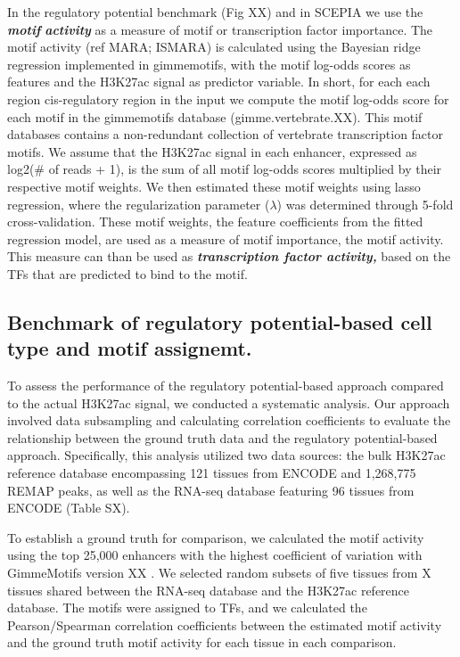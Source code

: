 In the regulatory potential benchmark (Fig XX) and in SCEPIA we use the \textbf{\textit{motif}} \textbf{\textit{activity}} as a measure of motif or transcription factor importance. The motif activity (ref MARA; ISMARA\cite{Balwierz2014}) is calculated using the Bayesian ridge regression implemented in gimmemotifs\cite{Bruse_2018}, with the motif log-odds scores as features and the H3K27ac signal as predictor variable. In short, for each each region cis-regulatory region in the input we compute the motif log-odds score for each motif in the gimmemotifs database (gimme.vertebrate.XX). This motif databases contains a non-redundant collection of vertebrate transcription factor motifs\cite{Bruse_2018}. We assume that the H3K27ac signal in each enhancer, expressed as log2(# of reads + 1), is the sum of all motif log-odds scores multiplied by their respective motif weights. We then estimated these motif weights using lasso regression, where the regularization parameter ($\lambda$) was determined through 5-fold cross-validation. These motif weights, the feature coefficients from the fitted regression model, are used as a measure of motif importance, the motif activity. This measure can than be used as \textit{\textbf{transcription factor activity,}} based on the TFs that are predicted to bind to the motif.

\subsection{Benchmark of regulatory potential-based cell type and motif assignemt.}

To assess the performance of the regulatory potential-based approach compared to the actual H3K27ac signal, we conducted a systematic analysis. Our approach involved data subsampling and calculating correlation coefficients to evaluate the relationship between the ground truth data and the regulatory potential-based approach. Specifically, this analysis utilized two data sources: the bulk H3K27ac reference database encompassing 121 tissues from ENCODE and 1,268,775 REMAP peaks, as well as the RNA-seq database featuring 96 tissues from ENCODE (Table SX).

To establish a ground truth for comparison, we calculated the motif activity using the top 25,000 enhancers with the highest coefficient of variation with GimmeMotifs version XX \cite{Bruse_2018}. We selected random subsets of five tissues from X tissues shared between the RNA-seq database and the H3K27ac reference database.  The motifs were assigned to TFs, and we calculated the Pearson/Spearman correlation coefficients between the estimated motif activity and the ground truth motif activity for each tissue in each comparison.

